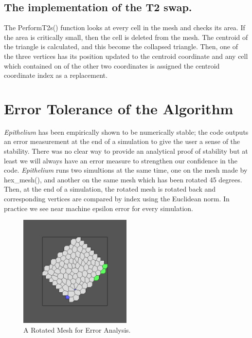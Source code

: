 \subsection{The implementation of the T2 swap.}
The PerformT2s() function looks at every cell in the mesh and checks its area. If the area is critically small, then the cell is deleted from the mesh. The centroid of the triangle is calculated, and this become the collapsed triangle. Then, one of the three vertices has its position updated to the centroid coordinate and any cell which contained on of the other two coordinates is assigned the centroid coordinate index as a replacement.

\section{Error Tolerance of the Algorithm}
\emph{Epithelium} has been empirically shown to be numerically stable; the code outputs an error measurement at the end of a simulation to give the user a sense of the stability. There was no clear way to provide an analytical proof of stability but at least we will always have an error measure to strengthen our confidence in the code. \emph{Epithelium} runs two simultions at the same time, one on the mesh made by hex\_mesh(), and another on the same mesh which has been rotated 45 degrees. Then, at the end of a simulation, the rotated mesh is rotated back and corresponding vertices are compared by index using the Euclidean norm. In practice we see near machine epsilon error for every simulation.

\begin{figure}[hr]
\centering
\includegraphics[width=0.5\textwidth]{../diagrams/rotate.png}
\caption{A Rotated Mesh for Error Analysis.}
\end{figure}
